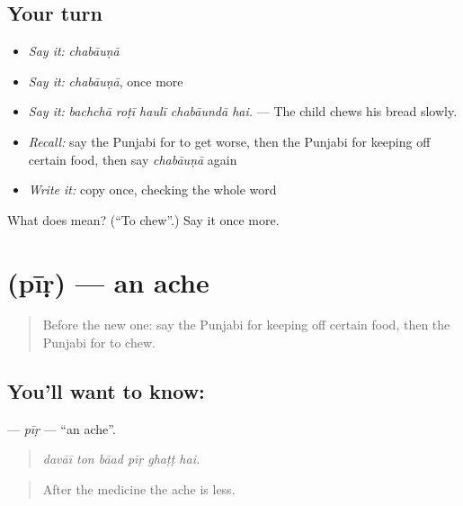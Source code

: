 \subsection*{Your turn}
\begin{itemize}
\raggedright
  \item \emph{Say it:} \emph{chabāuṇā}
  \item \emph{Say it:} \emph{chabāuṇā}, once more
  \item \emph{Say it:} \emph{bachchā roṭī haulī chabāundā hai.} — The child chews his bread slowly.
  \item \emph{Recall:} say the Punjabi for to get worse, then the Punjabi for keeping off certain food, then say \emph{chabāuṇā} again
  \item \emph{Write it:} copy \textbf{} once, checking the whole word
\end{itemize}

\begin{tcolorbox}[breakable,colback=teal!4,colframe=teal!35!black,title={Before you move on}]
What does  mean? (\textquotedblleft{}To chew\textquotedblright{}.) Say it once more.
\end{tcolorbox}
\section[\texorpdfstring{\pa{ਪੀੜ} (pīṛ)}{ਪੀੜ (pīṛ)}]{ (pīṛ) — an ache}

\label{lesson:PA-C325-pir}



\begin{quote}
Before the new one: say the Punjabi for keeping off certain food, then the Punjabi for to chew.
\end{quote}

\subsection*{You'll want to know: }
\textbf{} — \emph{pīṛ} — \textquotedblleft{}an ache\textquotedblright{}.

\begin{quote}
     
\end{quote}

\begin{quote}
\emph{davāī ton bāad pīṛ ghaṭṭ hai.}
\end{quote}

\begin{quote}
After the medicine the ache is less.
\end{quote}

